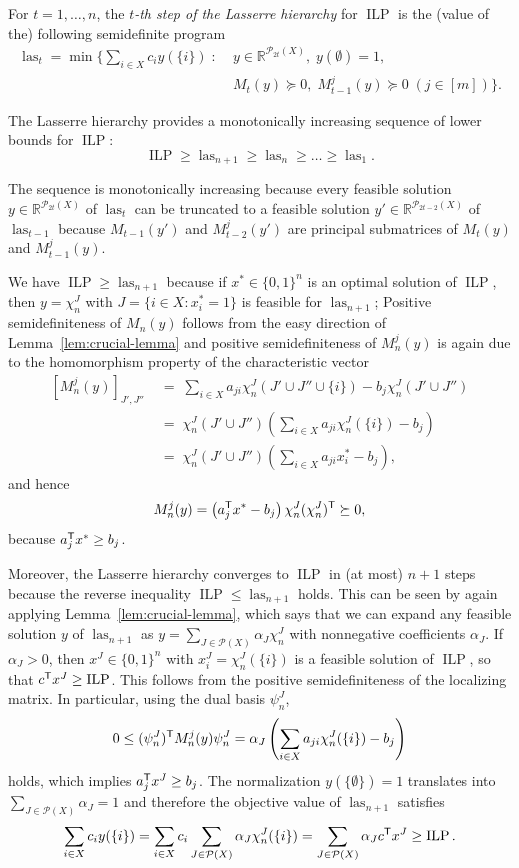 \documentclass{amsart}
\newcommand{\R}{\mathbb{R}}
\DeclareMathOperator{\ILP}{ILP}
\DeclareMathOperator{\las}{las}
\begin{document}
For $t = 1, \ldots, n$, the \emph{$t$-th step of the Lasserre
  hierarchy} for $\ILP$ is the (value of the) following semidefinite
program
\[
  \begin{split}
  \las_t = \min\Big\{\sum_{i \in X} c_i y(\{i\}) \; : \; & y \in
  \R^{\mathcal{P}_{2t}(X)}, \; y(\emptyset) = 1, \\[-3ex]
  & M_t(y) \succeq 0, \;   M^j_{t-1}(y) \succeq 0 \; (j \in [m])\Big\}.
 \end{split}
\]

The Lasserre hierarchy provides a monotonically increasing sequence of
lower bounds for $\ILP$:
\[
  \ILP \geq \las_{n+1} \geq \las_{n} \geq \ldots \geq \las_1.
\]

The sequence is monotonically increasing because every feasible
solution $y \in \R^{\mathcal{P}_{2t}(X)}$ of $\las_t$ can be truncated
to a feasible solution $y' \in \R^{\mathcal{P}_{2t-2}(X)}$ of
$\las_{t-1}$ because $M_{t-1}(y')$ and $M^j_{t-2}(y')$ are
principal submatrices of $M_t(y)$ and $M^j_{t-1}(y)$.
 
We have $\ILP \geq \las_{n+1}$ because if $x^* \in \{0,1\}^n$ is an
optimal solution of $\ILP$, then $y = \chi^J_n$ with
$J = \{i \in X : x^*_i = 1\}$ is feasible for $\las_{n+1}$; Positive
semidefiniteness of $M_n(y)$ follows from the easy direction of Lemma~\ref{lem:crucial-lemma} and positive semidefiniteness of
$M_n^j(y)$ is again due to the homomorphism property of the
characteristic vector
\[
\begin{split}
[M^j_{n}(y)]_{J',J''} & \; = \; \sum_{i \in X} a_{ji} \chi^J_n(J' \cup J''
\cup \{i\}) - b_j \chi^J_n(J' \cup J'')\\
& \; = \;
\chi^J_n(J' \cup J'') \left(\sum_{i \in X} a_{ji} \chi^J_n(\{i\}) - b_j\right)\\
& \;  = \; \chi^J_n(J' \cup J'') \left(\sum_{i \in X} a_{ji} x^*_i - b_j\right),
\end{split}
\]
and hence
\[
  M^j_{n}(y) = \left(a_j^{\sf T} x^* - b_j\right) \chi^J_n
  (\chi^J_n)^{\sf T} \succeq 0,
\]
because $a_j^{\sf T} x^* \geq b_j$.

 Moreover, the Lasserre hierarchy converges to $\ILP$ in (at most)
 $n+1$ steps because the reverse inequality $\ILP \leq \las_{n+1}$
 holds. This can be seen by again applying Lemma~\ref{lem:crucial-lemma},
 which says that we can expand any feasible solution $y$ of $\las_{n+1}$ as
 $y = \sum_{J \in \mathcal{P}(X)} \alpha_J \chi^J_n$ with nonnegative
 coefficients $\alpha_J$. If $\alpha_J > 0$, then $x^J \in \{0,1\}^n$
 with $x^J_i = \chi^J_n(\{i\})$ is a feasible solution of $\ILP$, so that
 $c^{\sf T} x^J \geq \ILP$. This
 follows from the positive semidefiniteness of the localizing
 matrix. In particular, using the dual basis $\psi^J_n$,
 \[
   0 \leq (\psi^{J}_n)^{\sf T} M^j_n(y) \psi^{J}_n
= \alpha_{J} \left(\sum_{i \in X} a_{ji} \chi^J_n(\{i\}) - b_j\right)
 \]
 holds, which implies $a_j^{\sf T} x^J \geq b_j$.  The normalization
 $y(\{\emptyset\})=1$ translates into
 $\sum_{J \in \mathcal{P}(X)} \alpha_J = 1$ and therefore the
 objective value of $\las_{n+1}$ satisfies
 \[
   \sum_{i \in X} c_i y(\{i\}) =   \sum_{i \in X} c_i \sum_{J \in
     \mathcal{P}(X)} \alpha_J \chi^J_n(\{i\}) =
   \sum_{J \in \mathcal{P}(X)} \alpha_J c^{\sf T} x^J
   \geq \ILP.
 \]
\end{document}
